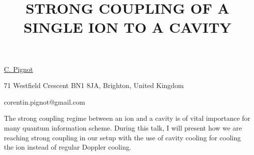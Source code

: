 \title{STRONG COUPLING OF A SINGLE ION TO A CAVITY}

\underline{C. Pignot}  

{\normalsize{\vspace{-4mm}
71 Westfield Crescent BN1 8JA,
Brighton,
United Kingdom



\email corentin.pignot@gmail.com}}

The strong coupling regime between an ion and a cavity is of vital importance for many quantum information scheme. During this talk, I will present how we are reaching strong coupling in our setup with the use of cavity cooling for cooling the ion instead of regular Doppler cooling.

\vspace{\baselineskip}